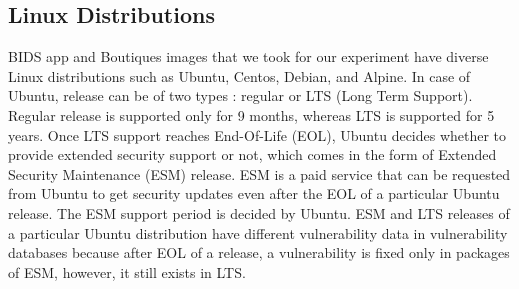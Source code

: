 \documentclass[a4paper,num-refs]{oup-contemporary}
\newcommand{\TG}[1]{\color{blue}From Tristan: #1\color{black}}
\begin{document}

\subsection{Linux Distributions}

BIDS app and Boutiques images that we took for our experiment have diverse Linux
distributions such as Ubuntu, Centos, Debian, and Alpine. In case of Ubuntu, release
can be of two types : regular or LTS (Long Term Support).
Regular release is supported only for 9 months, whereas LTS is supported for 5 years. Once LTS support
reaches End-Of-Life (EOL), Ubuntu decides whether to provide extended security support or not, which comes
in the form of Extended Security Maintenance (ESM) release.
ESM is a paid service that can be requested from Ubuntu to get security 
updates even after the EOL of a particular Ubuntu release. The ESM support period is decided by
Ubuntu. ESM and LTS releases of a particular Ubuntu distribution have different vulnerability
data in vulnerability databases because after EOL of a release, a vulnerability is fixed only in packages of ESM, however, it still
exists in LTS.
\end{document}
